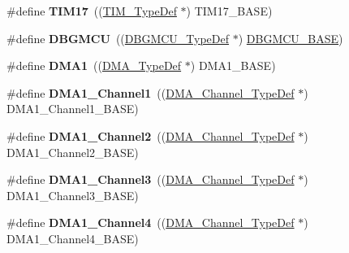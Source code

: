 \begin{DoxyCompactItemize}
\item 
\mbox{\label{group___peripheral__declaration_ga65aea6c8b36439e44ad6cde0e6891aab}} 
\#define {\bfseries T\+I\+M17}~((\hyperlink{struct_t_i_m___type_def}{T\+I\+M\+\_\+\+Type\+Def} $\ast$) T\+I\+M17\+\_\+\+B\+A\+SE)
\item 
\mbox{\label{group___peripheral__declaration_ga92ec6d9ec2251fda7d4ce09748cd74b4}} 
\#define {\bfseries D\+B\+G\+M\+CU}~((\hyperlink{struct_d_b_g_m_c_u___type_def}{D\+B\+G\+M\+C\+U\+\_\+\+Type\+Def} $\ast$) \hyperlink{group___peripheral__memory__map_ga4adaf4fd82ccc3a538f1f27a70cdbbef}{D\+B\+G\+M\+C\+U\+\_\+\+B\+A\+SE})
\item 
\mbox{\label{group___peripheral__declaration_gacc16d2a5937f7585320a98f7f6b578f9}} 
\#define {\bfseries D\+M\+A1}~((\hyperlink{struct_d_m_a___type_def}{D\+M\+A\+\_\+\+Type\+Def} $\ast$) D\+M\+A1\+\_\+\+B\+A\+SE)
\item 
\mbox{\label{group___peripheral__declaration_gac83c5be824be1c02716e2522e80ddf7a}} 
\#define {\bfseries D\+M\+A1\+\_\+\+Channel1}~((\hyperlink{struct_d_m_a___channel___type_def}{D\+M\+A\+\_\+\+Channel\+\_\+\+Type\+Def} $\ast$) D\+M\+A1\+\_\+\+Channel1\+\_\+\+B\+A\+SE)
\item 
\mbox{\label{group___peripheral__declaration_ga23d7631dd10c645e06971b2543ba2949}} 
\#define {\bfseries D\+M\+A1\+\_\+\+Channel2}~((\hyperlink{struct_d_m_a___channel___type_def}{D\+M\+A\+\_\+\+Channel\+\_\+\+Type\+Def} $\ast$) D\+M\+A1\+\_\+\+Channel2\+\_\+\+B\+A\+SE)
\item 
\mbox{\label{group___peripheral__declaration_gacf7b6093a37b306d7f1f50b2f200f0d0}} 
\#define {\bfseries D\+M\+A1\+\_\+\+Channel3}~((\hyperlink{struct_d_m_a___channel___type_def}{D\+M\+A\+\_\+\+Channel\+\_\+\+Type\+Def} $\ast$) D\+M\+A1\+\_\+\+Channel3\+\_\+\+B\+A\+SE)
\item 
\mbox{\label{group___peripheral__declaration_gad2c42743316bf64da557130061b1f56a}} 
\#define {\bfseries D\+M\+A1\+\_\+\+Channel4}~((\hyperlink{struct_d_m_a___channel___type_def}{D\+M\+A\+\_\+\+Channel\+\_\+\+Type\+Def} $\ast$) D\+M\+A1\+\_\+\+Channel4\+\_\+\+B\+A\+SE)

\end{DoxyCompactItemize}
